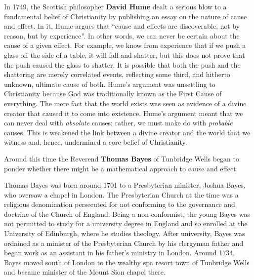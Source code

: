 \documentclass[a4paper,11pt]{apa7}
\begin{document}
In 1749, the Scottish philosopher \textbf{David Hume} dealt a serious blow to a fundamental belief of Christianity by publishing an essay on the nature of cause and effect. In it, Hume argues that ``cause and effects are discoverable, not by reason, but by experience''. In other words, we can never be certain about the cause of a given effect. For example, we know from experience that if we push a glass off the side of a table, it will fall and shatter, but this does not prove that the push caused the glass to shatter. It is possible that both the push and the shattering are merely correlated events, reflecting some third, and hitherto  unknown, ultimate cause of both. Hume's argument was unsettling to Christianity because God was traditionally known as the First Cause of everything. The mere fact that the world exists was seen as evidence of a divine creator that caused it to come into existence. Hume's argument meant that we can never deal with \emph{absolute} causes; rather, we must make do with \emph{probable} causes. This is weakened the link between a divine creator and the world that we witness and, hence, undermined a core belief of Christianity.

Around this time the Reverend \textbf{Thomas Bayes} of Tunbridge Wells began to ponder whether there might be a mathematical approach to cause and effect.

Thomas Bayes was born around 1701 to a Presbyterian minister, Joshua Bayes, who oversaw a chapel in London. The Presbyterian Church at the time was a religious denomination persecuted for not conforming to the governance and doctrine of the Church of England. Being a non-conformist, the young Bayes was not permitted to study for a university degree in England and so enrolled at the University of Edinburgh, where he studies theology. After university, Bayes was ordained as a minister of the Presbyterian Church by his clergyman father and began work as an assistant in his father's ministry in London. Around 1734, Bayes moved south of London to the wealthy spa resort town of Tunbridge Wells and became minister of the Mount Sion chapel there.
\end{document}
